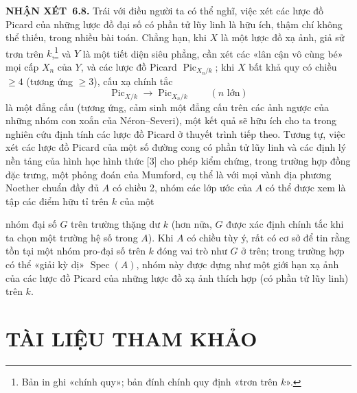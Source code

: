 \documentclass[11pt,twoside,openany]{book}
\numberwithin{equation}{section}
\newcommand{\src}[1]{%
  \phantomsection\hypertarget{src:\fgasourceid:#1}{}%
  \marginpar{\raggedleft\footnotesize\sffamily #1}%
}
\newcommand{\fgasourceid}{unset}
\newcommand{\result}[2]{\par\medskip\noindent\textbf{#1\if\relax\detokenize{#2}\relax\else\ #2\fi.}\quad}
\begin{document}
\result{NHẬN XÉT}{6.8} Trái với điều người ta có thể nghĩ, việc xét các lược đồ
Picard của những lược đồ đại số có phần tử lũy linh là hữu ích, thậm chí không
thể thiếu, trong nhiều bài toán. Chẳng hạn, khi $X$ là một lược đồ xạ ảnh, giả
sử trơn trên $k$,\footnote{Bản in ghi «chính quy»; bản đính chính quy định «trơn
trên $k$».} và $Y$ là một tiết diện siêu phẳng, cần xét các «lân cận vô cùng
bé» mọi cấp $X_n$ của $Y$, và các lược đồ Picard
$\operatorname{Pic}_{X_n/k}$; khi $X$ bất khả quy có chiều $\geq4$ (tương ứng
$\geq3$), cấu xạ chính tắc
\[
\operatorname{Pic}_{X/k}\longrightarrow\operatorname{Pic}_{X_n/k}
\qquad(n\text{ lớn})
\]
là một đẳng cấu (tương ứng, cảm sinh một đẳng cấu trên các ảnh ngược của những
nhóm con xoắn của Néron--Severi), một kết quả sẽ hữu ích cho ta trong nghiên
cứu định tính các lược đồ Picard ở thuyết trình tiếp theo. Tương tự, việc xét
các lược đồ Picard của một số đường cong có phần tử lũy linh và các định lý nền
tảng của hình học hình thức [3] cho phép kiểm chứng, trong trường hợp đồng đặc
trưng, một phỏng đoán của Mumford, cụ thể là với mọi vành địa phương Noether
chuẩn đầy đủ $A$ có chiều 2, nhóm các lớp ước của $A$ có thể được xem là tập
các điểm hữu tỉ trên $k$ của một
\src{161}
nhóm đại số $G$ trên trường thặng dư $k$ (hơn nữa, $G$ được xác định chính tắc
khi ta chọn một trường hệ số trong $A$). Khi $A$ có chiều tùy ý, rất có cơ sở
để tin rằng tồn tại một nhóm pro-đại số trên $k$ đóng vai trò như $G$ ở trên;
trong trường hợp có thể «giải kỳ dị» $\operatorname{Spec}(A)$, nhóm này được
dựng như một giới hạn xạ ảnh của các lược đồ Picard của những lược đồ xạ ảnh
thích hợp (có phần tử lũy linh) trên $k$.

\section*{TÀI LIỆU THAM KHẢO}
\end{document}

